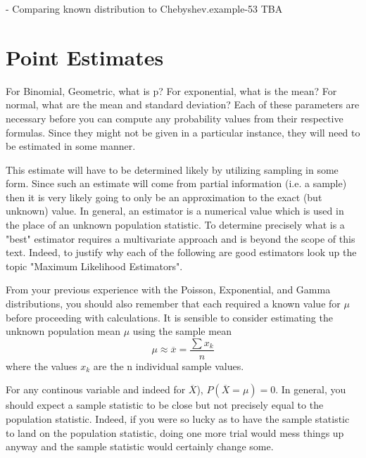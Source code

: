 \documentclass[10pt,]{book}
\numberwithin{equation}{section}
\begin{document}
%
\begin{example}{- Comparing known distribution to Chebyshev.}{example-53}%
\hypertarget{p-1332}{}%
TBA%
\end{example}
%
%
\typeout{************************************************}
\typeout{************************************************}
%
\section[{Point Estimates}]{Point Estimates}\label{section-67}
\hypertarget{p-1333}{}%
For Binomial, Geometric, what is p? For exponential, what is the mean?  For normal, what are the mean and standard deviation? Each of these parameters are necessary before you can compute any probability values from their respective formulas. Since they might not be given in a particular instance, they will need to be estimated in some manner.%
\par
\hypertarget{p-1334}{}%
This estimate will have to be determined likely by utilizing sampling in some form. Since such an estimate will come from partial information (i.e. a sample) then it is very likely going to only be an approximation to the exact (but unknown) value. In general, an estimator is a numerical value which is used in the place of an unknown population statistic. To determine precisely what is a "best" estimator requires a multivariate approach and is beyond the scope of this text. Indeed, to justify why each of the following are good estimators look up the topic "Maximum Likelihood Estimators".%
\par
\hypertarget{p-1335}{}%
From your previous experience with the Poisson, Exponential, and Gamma distributions, you should also remember that each required a known value for \(\mu\) before proceeding with calculations.  It is sensible to consider estimating the unknown population mean \(\mu\) using the sample mean%
\begin{equation*}
\mu \approx \overline{x} = \frac{\sum x_k}{n}
\end{equation*}
where the values \(x_k\) are the n individual sample values.%
\par
\hypertarget{p-1336}{}%
For any continous variable and indeed for \(\overline{X}\)), \(P(\overline{X} = \mu) = 0\). In general, you should expect a sample statistic to be close but not precisely equal to the population statistic. Indeed, if you were so lucky as to have the sample statistic to land on the population statistic, doing one more trial would mess things up anyway and the sample statistic would certainly change some.%
\end{document}
